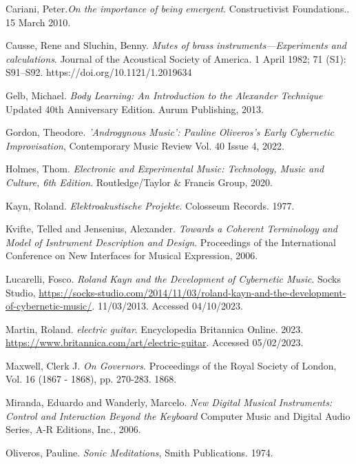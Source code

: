 \begin{thebibliography}{99}
 Cariani, Peter.\emph{On the importance of being emergent}. Constructivist Foundations.. 15 March 2010.

 Causse, Rene and Sluchin, Benny. \emph{Mutes of brass instruments—Experiments and calculations}. Journal of the Acoustical Society of America. 1 April 1982; 71 (S1): S91–S92. https://doi.org/10.1121/1.2019634


 Gelb, Michael. \emph{Body Learning: An Introduction to the Alexander Technique} Updated 40th Anniversary Edition. Aurum Publishing, 2013.

 Gordon, Theodore. \emph{'Androgynous Music': Pauline Oliveros's Early Cybernetic Improvisation}, Contemporary Music Review Vol. 40 Issue 4, 2022.

 Holmes, Thom. \emph{Electronic and Experimental Music: Technology, Music and Culture, 6th Edition}. Routledge/Taylor \& Francis Group, 2020.

 Kayn, Roland. \emph{Elektroakustische Projekte}. Colosseum Records. 1977.

 Kvifte, Telled and Jensenius, Alexander. \emph{Towards a Coherent Terminology and Model of Isntrument Description and Design}. Proceedings of the International Conference on New Interfaces for Musical Expression, 2006.

 Lucarelli, Fosco. \emph{Roland Kayn and the Development of Cybernetic Music}. Socks Studio, \url{https://socks-studio.com/2014/11/03/roland-kayn-and-the-development-of-cybernetic-music/}. 11/03/2013. Accessed 04/10/2023.

 Martin, Roland. \emph{electric guitar}. Encyclopedia Britannica Online. 2023. \url{https://www.britannica.com/art/electric-guitar}. Accessed 05/02/2023.

 Maxwell, Clerk J. \emph{On Governors}. Proceedings of the Royal Society of London, Vol. 16 (1867 - 1868), pp. 270-283. 1868.

 Miranda, Eduardo and Wanderly, Marcelo. \emph{New Digital Musical Instruments: Control and Interaction Beyond the Keyboard} Computer Music and Digital Audio Series, A-R Editions, Inc., 2006.

 Oliveros, Pauline. \emph{Sonic Meditations}, Smith Publications. 1974.


\end{thebibliography}
